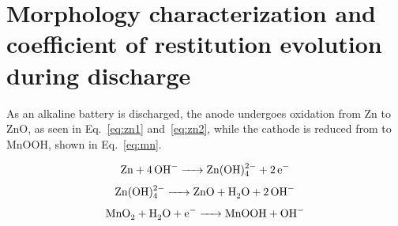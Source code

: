 \label{sec:dbb:results}

\section{Morphology characterization and coefficient of restitution evolution during discharge}
As an alkaline battery is discharged, the anode undergoes oxidation from Zn to ZnO, as seen in Eq.~\ref{eq:zn1} and~\ref{eq:zn2}, while the cathode is reduced from {} to MnOOH, shown in Eq.~\ref{eq:mn}.

\begin{equation}
{\ce{Zn + 4OH^- -> Zn(OH)^{2-}_{4} + 2e^-}}
\label{eq:zn1}
\end{equation}
\begin{equation}
{\ce{Zn(OH)^{2-}_{4} -> ZnO + H_{2}O + 2OH^-}}
\label{eq:zn2}
\end{equation}
\begin{equation}
{\ce{MnO_{2} + H_{2}O + e- -> MnOOH + OH^-}}
\label{eq:mn}
\end{equation}

